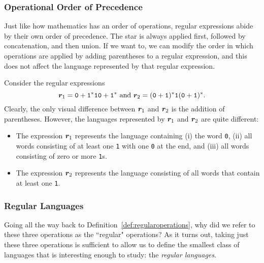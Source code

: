 \subsubsection*{Operational Order of Precedence}

Just like how mathematics has an order of operations, regular expressions abide by their own order of precedence. The star is always applied first, followed by concatenation, and then union. If we want to, we can modify the order in which operations are applied by adding parentheses to a regular expression, and this does not affect the language represented by that regular expression.

\begin{example}
Consider the regular expressions
\begin{equation*}
\bm r_{1} = \texttt{0} + \texttt{1}^{*}\texttt{10} + \texttt{1}^{*} \text{ and } \bm r_{2} = (\texttt{0} + \texttt{1})^{*}\texttt{1}(\texttt{0} + \texttt{1})^{*}.
\end{equation*}
Clearly, the only visual difference between $\bm r_{1}$ and $\bm r_{2}$ is the addition of parentheses. However, the languages represented by $\bm r_{1}$ and $\bm r_{2}$ are quite different:
\begin{itemize}
\item The expression $\bm r_{1}$ represents the language containing (i) the word \texttt{0}, (ii) all words consisting of at least one \texttt{1} with one \texttt{0} at the end, and (iii) all words consisting of zero or more \texttt{1}s.
\item The expression $\bm r_{2}$ represents the language consisting of all words that contain at least one \texttt{1}.
\end{itemize}
\end{example}

\subsubsection*{Regular Languages}

Going all the way back to Definition~\ref{def:regularoperations}, why did we refer to these three operations as the ``regular" operations? As it turns out, taking just these three operations is sufficient to allow us to define the smallest class of languages that is interesting enough to study: the \emph{regular languages}.

